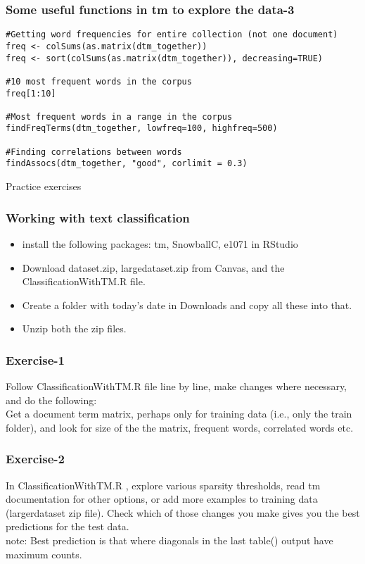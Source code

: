 \documentclass{beamer}
\begin{document}
\begin{frame}[fragile]
\frametitle{Some useful functions in tm to explore the data-3}
\footnotesize
\begin{verbatim}
#Getting word frequencies for entire collection (not one document)
freq <- colSums(as.matrix(dtm_together))
freq <- sort(colSums(as.matrix(dtm_together)), decreasing=TRUE)

#10 most frequent words in the corpus
freq[1:10]

#Most frequent words in a range in the corpus
findFreqTerms(dtm_together, lowfreq=100, highfreq=500)

#Finding correlations between words
findAssocs(dtm_together, "good", corlimit = 0.3)
\end{verbatim}
\end{frame}

\begin{frame}
\center
\Large Practice exercises
\end{frame}

\begin{frame}
\frametitle{Working with text classification}
\begin{itemize}
\item install the following packages: tm, SnowballC, e1071 in RStudio
\item Download dataset.zip, largedataset.zip from Canvas, and the ClassificationWithTM.R file.
\item Create a folder with today's date in Downloads and copy all these into that.
\item Unzip both the zip files.
\end{itemize}
\end{frame}


\begin{frame}
\frametitle{Exercise-1}
Follow ClassificationWithTM.R file line by line, make changes where necessary, and do the following: \bigskip \\
Get a document term matrix, perhaps only for training data (i.e., only the train folder), and look for size of the the matrix, frequent words, correlated words etc.
\end{frame}

\begin{frame}
\frametitle{Exercise-2}
In ClassificationWithTM.R , explore various sparsity thresholds, read tm documentation for other options, or add more examples to training data (largerdataset zip file). Check which of those changes you make gives you the best predictions for the test data. \bigskip \\ note: Best prediction is that where diagonals in the last table() output have maximum counts.
\end{frame}
\end{document}
